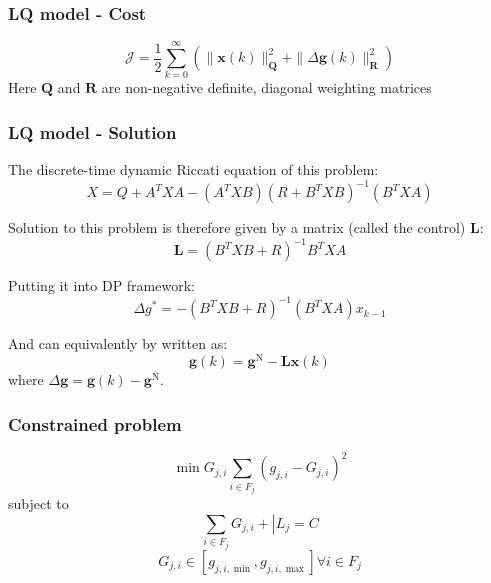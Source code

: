 \documentclass{beamer}
\begin{document}
\begin{frame}
\frametitle{LQ model - Cost}
\begin{equation}
\mathcal{J}=\frac{1}{2} \sum_{k=0}^{\infty}\left(\|\mathbf{x}(k)\|_{\mathbf{Q}}^{2}+\|\Delta \mathbf{g}(k)\|_{\mathbf{R}}^{2}\right)
\end{equation}
Here $\mathbf{Q}$ and $\mathbf{R}$ are non-negative definite, diagonal weighting matrices
\end{frame}


\begin{frame}
\frametitle{LQ model - Solution}
The discrete-time dynamic Riccati equation of this problem:
\begin{equation}
X = Q+ A ^ { T } X A - \left( A ^ { T } X B \right) \left( R + B ^ { T } X B \right) ^ { - 1 } \left( B ^ { T } X A \right)
\end{equation}

Solution to this problem is therefore given by a matrix (called the control) $\mathbf{L}$:
\begin{equation}
\mathbf{L} = \left(B ^ { T } X B +R \right) ^ { - 1 } B ^ { T } X A %
\end{equation}

Putting it into DP framework:
\begin{equation} 
\Delta g  ^ { * } = - \left( B ^ { T } X  B + R \right) ^ { - 1 } \left( B ^ { T } X  A \right) x _ { k - 1 }
\end{equation}

And can equivalently by written as:
\begin{equation} 
\mathbf { g } ( k ) = \mathbf { g } ^ { \mathrm { N } } - \mathbf { L } \mathbf { x } ( k )
\end{equation}
where $\Delta \mathbf {g } = \mathbf { g } ( k ) - \mathbf {g } ^ { \mathrm { N } }$.\\
\end{frame}
\begin{frame}
\frametitle{Constrained problem}
\begin{equation} \operatorname { min } { G _ { j , i } } \sum _ { i \in F _ { j } } \left( g _ { j , i } - G _ { j , i } \right) ^ { 2 }\end{equation} 
subject to
\begin{equation} 
\sum _ { i \in F _ { j } } G _ { j , i } + \left| L _ { j } = C \right.
\end{equation} 
\begin{equation} 
G _ { j , i } \in \left[ g _ { j , i , \min } , g _ { j , i , \max } \right] \forall i \in F _ { j }
\end{equation} 

\end{frame}
\end{document}
